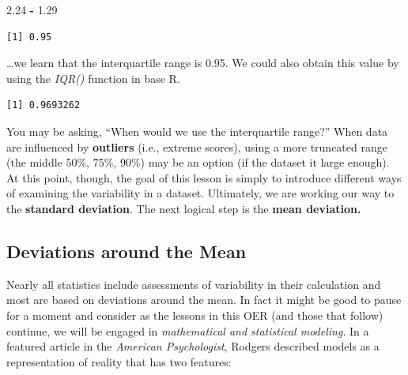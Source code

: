 \documentclass[
  11pt,
]{book}
\newenvironment{Shaded}{\begin{snugshade}}{\end{snugshade}}
\newcommand{\AttributeTok}[1]{\textcolor[rgb]{0.27,0.27,0.27}{#1}}
\newcommand{\ConstantTok}[1]{\textcolor[rgb]{0.37,0.37,0.37}{#1}}
\newcommand{\FloatTok}[1]{\textcolor[rgb]{0.06,0.06,0.06}{#1}}
\newcommand{\FunctionTok}[1]{\textcolor[rgb]{0.27,0.27,0.27}{\textbf{#1}}}
\newcommand{\NormalTok}[1]{#1}
\newcommand{\SpecialCharTok}[1]{\textcolor[rgb]{0.43,0.43,0.43}{\textbf{#1}}}
\begin{document}
\begin{Shaded}
\begin{Highlighting}[]
\FloatTok{2.24} \SpecialCharTok{{-}} \FloatTok{1.29}
\end{Highlighting}
\end{Shaded}

\begin{verbatim}
[1] 0.95
\end{verbatim}

\ldots we learn that the interquartile range is 0.95. We could also obtain this value by using the \emph{IQR()} function in base R.

\begin{Shaded}
\end{Shaded}

\begin{verbatim}
[1] 0.9693262
\end{verbatim}

You may be asking, ``When would we use the interquartile range?'' When data are influenced by \textbf{outliers} (i.e., extreme scores), using a more truncated range (the middle 50\%, 75\%, 90\%) may be an option (if the dataset it large enough). At this point, though, the goal of this lesson is simply to introduce different ways of examining the variability in a dataset. Ultimately, we are working our way to the \textbf{standard deviation}. The next logical step is the \textbf{mean deviation.}

\hypertarget{deviations-around-the-mean}{%
\subsection{Deviations around the Mean}\label{deviations-around-the-mean}}

Nearly all statistics include assessments of variability in their calculation and most are based on deviations around the mean. In fact it might be good to pause for a moment and consider as the lessons in this OER (and those that follow) continue, we will be engaged in \emph{mathematical and statistical modeling}. In a featured article in the \emph{American Psychologist}, Rodgers \citeyearpar{rodgers_epistemology_2010} described models as a representation of reality that has two features:
\end{document}
